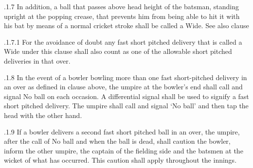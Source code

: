 \documentclass[12pt]{article}
\begin{document}
\vspace{\baselineskip}
\begin{adjustwidth}{1.18in}{0.24in}
{\fontsize{9pt}{10.8pt}.1.7 \tabto{1.17in} In addition, a ball that passes above head height of the batsman, standing upright at the popping crease, that prevents him from being able to hit it with his bat by means of a normal cricket stroke shall be called a Wide. See also clause \par}\par

\end{adjustwidth}


\vspace{\baselineskip}
\begin{adjustwidth}{1.97in}{0.07in}
{\fontsize{9pt}{10.8pt}.1.7.1 \tabto{1.96in} For the avoidance of doubt any fast short pitched delivery that is called a Wide under this clause shall also count as one of the allowable short pitched deliveries in that over.\par}\par

\end{adjustwidth}


\vspace{\baselineskip}
\begin{adjustwidth}{1.18in}{0.07in}
{\fontsize{9pt}{10.8pt}.1.8 \tabto{1.17in} In the event of a bowler bowling more than one fast short-pitched delivery in an over as defined in clause above, the umpire at the bowler’s end shall call and signal No ball on each occasion. A differential signal shall be used to signify a fast short pitched delivery. The umpire shall call and signal ‘No ball’ and then tap the head with the other hand.\par}\par

\end{adjustwidth}


\vspace{\baselineskip}
\begin{adjustwidth}{1.18in}{0.12in}
{\fontsize{9pt}{10.8pt}.1.9 \tabto{1.17in} If a bowler delivers a second fast short pitched ball in an over, the umpire, after the call of No ball and when the ball is dead, shall caution the bowler, inform the other umpire, the captain of the fielding side and the batsmen at the wicket of what has occurred. This caution shall apply throughout the innings.\par}\par

\end{adjustwidth}
\end{document}
